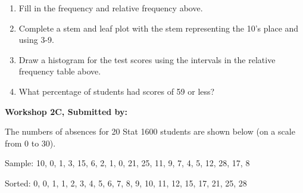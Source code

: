 \documentclass[11pt]{book}\usepackage[]{graphicx}\usepackage[]{color}
\begin{document}
\begin{exercises}
\begin{exercise}
    \end{exercise}
    \begin{solution} %

  \begin{enumerate}
  \item Fill in the frequency and relative frequency above.
  \item	Complete a stem and leaf plot with the stem representing the 10’s place and using 3-9.
  \item Draw a histogram for the test scores using the intervals in the relative frequency table above.
  \item	What percentage of students had scores of 59 or less?
\end{enumerate}

    \end{solution}

\clearpage

    \begin{exercise}  %

    \begin{center}
\begin{flushleft}\textbf{\large \hfill Workshop 2C, Submitted by: }\end{flushleft}

\end{center}

The numbers of absences for 20 Stat 1600 students are shown below (on a scale from 0 to 30).

Sample:	10, 0, 1, 3, 15, 6, 2, 1, 0, 21, 25, 11, 9, 7, 4, 5, 12, 28, 17, 8

Sorted:	0, 0, 1, 1, 2, 3, 4, 5, 6, 7, 8, 9, 10, 11, 12, 15, 17, 21, 25, 28



\end{exercise}
\end{exercises}
\end{document}
